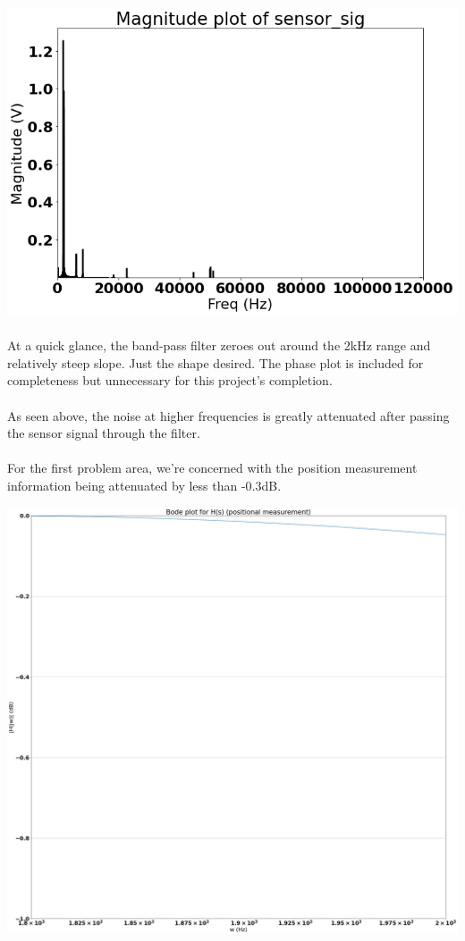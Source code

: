 \documentclass[12pt]{report}
\begin{document}
    \includegraphics[scale = 0.5]{Figure 2022-04-20 163927 (12).png}
    
    \paragraph{} At a quick glance, the band-pass filter zeroes out around the 2kHz range and relatively steep slope. Just the shape desired. The phase plot is included for completeness but unnecessary for this project's completion. 
    
    \paragraph{} As seen above, the noise at higher frequencies is greatly attenuated after passing the sensor signal through the filter.
    
    \paragraph{} For the first problem area, we're concerned with the position measurement information being attenuated by less than -0.3dB.
    
    \includegraphics[scale = 0.2]{Figure 2022-04-20 163927 (8).png}
    
\end{document}
